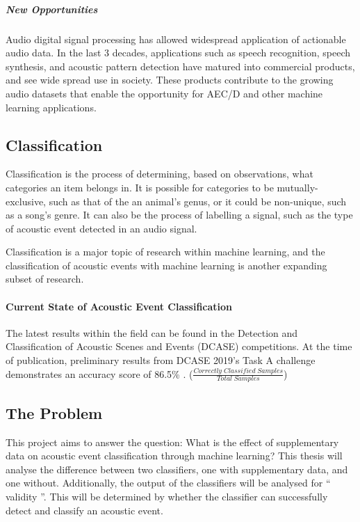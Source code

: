 \documentclass{UoNMCHA}
\newcommand{\inlineQuote}[1]{`` #1 ''}
\numberwithin{equation}{section}
\begin{document}
\subparagraph{New Opportunities}
Audio digital signal processing has allowed widespread application of actionable audio data. In the last 3 decades, applications such as speech recognition, speech synthesis, and acoustic pattern detection have matured into commercial products, and see wide spread use in society. These products contribute to the growing audio datasets that enable the opportunity for AEC/D and other machine learning applications.

\subsection{Classification}
Classification is the process of determining, based on observations, what categories an item belongs in. %
It is possible for categories to be mutually-exclusive, such as that of the an animal's genus, or it could be non-unique, such as a song's genre. It can also be the process of labelling a signal, such as the type of acoustic event detected in an audio signal.

Classification is a major topic of research within machine learning, and the classification of acoustic events with machine learning is another expanding subset of research.

\paragraph{Current State of Acoustic Event Classification}
The latest results within the field can be found in the Detection and Classification of Acoustic Scenes and Events (DCASE) competitions. At the time of publication, preliminary results from DCASE 2019's Task A challenge demonstrates an accuracy score of 86.5\%  \cite{Mesaros2018_DCASE}. ({\small $ \frac{Correctly\;Classified\;Samples}{Total\;Samples} $})

\subsection{The Problem}
This project aims to answer the question: What is the effect of supplementary data on acoustic event classification through machine learning?
This thesis will analyse the difference between two classifiers, one with supplementary data, and one without. 
Additionally, the output of the classifiers will be analysed for \inlineQuote{validity}. This will be determined by whether the classifier can successfully detect and classify an acoustic event.
\end{document}
